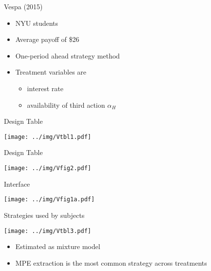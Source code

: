 \documentclass{beamer}
\begin{document}
\begin{frame}{Vespa (2015) }
	\begin{itemize}
		\item NYU students
		\item Average payoff of \$26
		\item One-period ahead strategy method
		\item Treatment variables are
		\begin{itemize}
			\item interest rate
			\item availability of third action $\alpha_H$
		\end{itemize}
	\end{itemize}
\end{frame}

\begin{frame}{Design Table}
\begin{center}
	\texttt{[image: ../img/Vtbl1.pdf]}
\end{center}
\end{frame}

\begin{frame}{Design Table}
\begin{center}
	\texttt{[image: ../img/Vfig2.pdf]}
\end{center}
\end{frame}

\begin{frame}{Interface}
\begin{center}
	\texttt{[image: ../img/Vfig1a.pdf]}
\end{center}
\end{frame}

\begin{frame}{Strategies used by subjects}
\begin{center}
	\texttt{[image: ../img/Vtbl3.pdf]}
\end{center}
\begin{itemize}
	\item Estimated as mixture model
	\item MPE extraction is the most common strategy across treatments
\end{itemize}
\end{frame}
\end{document}
